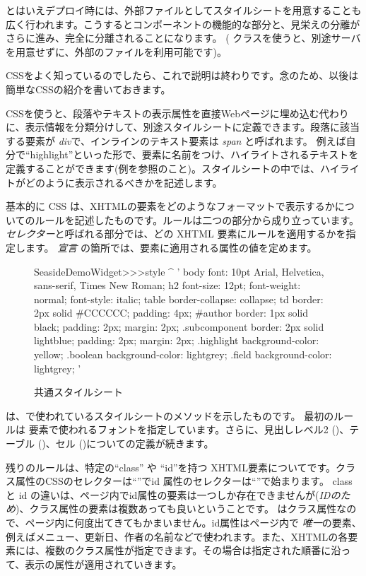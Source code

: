 \documentclass[a4paper,10pt,twoside]{book}
\begin{document}
とはいえデプロイ時には、外部ファイルとしてスタイルシートを用意することも広く行われます。こうするとコンポーネントの機能的な部分と、見栄えの分離がさらに進み、完全に分離されることになります。
( クラスを使うと、別途サーバを用意せずに、外部のファイルを利用可能です)。

CSSをよく知っているのでしたら、これで説明は終わりです。念のため、以後は簡単なCSSの紹介を書いておきます。

CSSを使うと、段落やテキストの表示属性を直接Webページに埋め込む代わりに、表示情報を分類分けして、別途スタイルシートに定義できます。段落に該当する要素が \emph{div}で、インラインのテキスト要素は \emph{span} と呼ばれます。
例えば自分で``highlight''といった形で、要素に名前をつけ、ハイライトされるテキストを定義することができます(例を参照のこと)。スタイルシートの中では、ハイライトがどのように表示されるべきかを記述します。

基本的に CSS は、XHTMLの要素をどのようなフォーマットで表示するかについてのルールを記述したものです。ルールは二つの部分から成り立っています。
 \emph{セレクター}と呼ばれる部分では、どの XHTML 要素にルールを適用するかを指定します。 \emph{宣言} の箇所では、要素に適用される属性の値を定めます。

\begin{figure}[tb]
\begin{code}{}
SeasideDemoWidget>>>style
	^ '
body {
	font: 10pt Arial, Helvetica, sans-serif, Times New Roman;
}
h2 {
	font-size: 12pt;
	font-weight: normal;
	font-style: italic;
}
table { border-collapse: collapse; }
td {
	border: 2px solid #CCCCCC;
	padding: 4px;
}
#author {
	border: 1px solid black;
	padding: 2px;
	margin: 2px;
}
.subcomponent {
	border: 2px solid lightblue;
	padding: 2px;
	margin: 2px;
}
.highlight { background-color: yellow; }
.boolean { background-color: lightgrey; }
.field { background-color: lightgrey; }
'
\end{code}
\caption{ 共通スタイルシート
}
\end{figure}

 は、で使われているスタイルシートのメソッドを示したものです。
最初のルールは 要素で使われるフォントを指定しています。さらに、見出しレベル2 ()、テーブル ()、セル ()についての定義が続きます。

残りのルールは、特定の``class'' や ``id''を持つ XHTML要素についてです。クラス属性のCSSのセレクターは``''でid 属性のセレクターは``\ct{#}''で始まります。
classと id の違いは、ページ内でid属性の要素は一つしか存在できませんが(\emph{IDのため})、クラス属性の要素は複数あっても良いということです。 はクラス属性なので、ページ内に何度出てきてもかまいません。id属性はページ内で \emph{唯一}の要素、例えばメニュー、更新日、作者の名前などで使われます。また、XHTMLの各要素には、複数のクラス属性が指定できます。その場合は指定された順番に沿って、表示の属性が適用されていきます。
\end{document}
